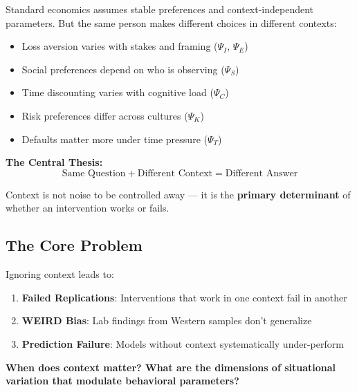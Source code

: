 Standard economics assumes stable preferences and context-independent parameters.
But the same person makes different choices in different contexts:

\begin{itemize}
\item Loss aversion varies with stakes and framing ($\Psi_I$, $\Psi_E$)
\item Social preferences depend on who is observing ($\Psi_S$)
\item Time discounting varies with cognitive load ($\Psi_C$)
\item Risk preferences differ across cultures ($\Psi_K$)
\item Defaults matter more under time pressure ($\Psi_T$)
\end{itemize}

\begin{tcolorbox}[colback=yellow!5!white, colframe=yellow!75!black,
    title=Context as Multiplier]
\textbf{The Central Thesis:}
\[
\text{Same Question} + \text{Different Context} = \text{Different Answer}
\]

Context is not noise to be controlled away --- it is the \textbf{primary determinant}
of whether an intervention works or fails.
\end{tcolorbox}

\subsection{The Core Problem}

Ignoring context leads to:

\begin{enumerate}
\item \textbf{Failed Replications}: Interventions that work in one context fail in another
\item \textbf{WEIRD Bias}: Lab findings from Western samples don't generalize
\item \textbf{Prediction Failure}: Models without context systematically under-perform
\end{enumerate}

\begin{tcolorbox}[colback=red!5!white, colframe=red!75!black,
    title=The Fundamental Question]
\textbf{When does context matter? What are the dimensions of situational variation that modulate behavioral parameters?}
\end{tcolorbox}


